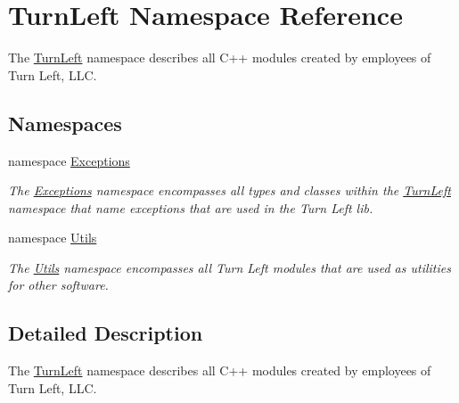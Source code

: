 \hypertarget{namespaceTurnLeft}{
\section{TurnLeft Namespace Reference}
\label{namespaceTurnLeft}
}


The \hyperlink{namespaceTurnLeft}{TurnLeft} namespace describes all C++ modules created by employees of Turn Left, LLC.  


\subsection*{Namespaces}
\begin{DoxyCompactItemize}
\item 
namespace \hyperlink{namespaceTurnLeft_1_1Exceptions}{Exceptions}


\begin{DoxyCompactList}\small\item\em The \hyperlink{namespaceTurnLeft_1_1Exceptions}{Exceptions} namespace encompasses all types and classes within the \hyperlink{namespaceTurnLeft}{TurnLeft} namespace that name exceptions that are used in the Turn Left lib. \item\end{DoxyCompactList}

\item 
namespace \hyperlink{namespaceTurnLeft_1_1Utils}{Utils}


\begin{DoxyCompactList}\small\item\em The \hyperlink{namespaceTurnLeft_1_1Utils}{Utils} namespace encompasses all Turn Left modules that are used as utilities for other software. \item\end{DoxyCompactList}

\end{DoxyCompactItemize}


\subsection{Detailed Description}
The \hyperlink{namespaceTurnLeft}{TurnLeft} namespace describes all C++ modules created by employees of Turn Left, LLC. 